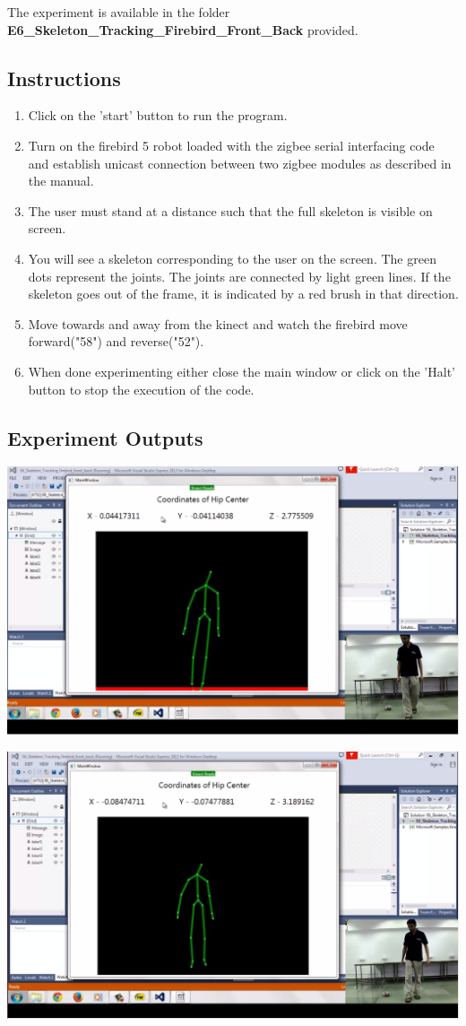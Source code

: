 \begin{flushleft}
\medskip
The experiment is available in the folder \textbf{E6\_Skeleton\_Tracking\_Firebird\_Front\_Back} provided.
\medskip

\subsection{\textbf{ Instructions}}
\begin{enumerate}
\item Click on the 'start' button to run the program.
\item Turn on the firebird 5 robot loaded with the zigbee serial interfacing code and establish unicast connection between two zigbee modules as described in the manual.
\item The user must stand at a distance such that the full skeleton is visible on screen.
\item You will see a skeleton corresponding to the user on the screen. The green dots represent the joints. The joints are connected by light green lines. If the skeleton goes out of the frame, it is indicated by a red brush in that direction.
\item Move towards and away from the kinect and watch the firebird move forward("58") and reverse("52").
\item When done experimenting either close the main window or click on the 'Halt' button to stop the execution of the code.
\end{enumerate}
\medskip
\subsection{\textbf{ Experiment Outputs}}
\includegraphics[scale = 0.4]{e61}

\medskip
\includegraphics[scale = 0.4]{e62}
\medskip

\end{flushleft}
